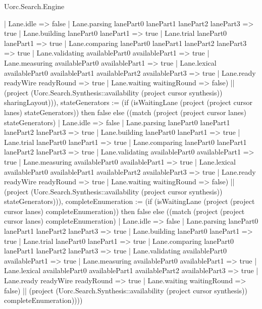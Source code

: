 \begin{lexlean}{Uorc.Search.Engine}
\begin{semanticmodule}
{{    | Lane.idle => false
    | Lane.parsing lanePart0 lanePart1 lanePart2 lanePart3 => true
    | Lane.building lanePart0 lanePart1 => true
    | Lane.trial lanePart0 lanePart1 => true
    | Lane.comparing lanePart0 lanePart1 lanePart2 lanePart3 => true
    | Lane.validating availablePart0 availablePart1 => true
    | Lane.measuring availablePart0 availablePart1 => true
    | Lane.lexical availablePart0 availablePart1 availablePart2 availablePart3 => true
    | Lane.ready readyWire readyRound => true
    | Lane.waiting waitingRound => false) || (project (Uorc.Search.Synthesis::availability (project cursor synthesis)) sharingLayout))), stateGenerators := (if (isWaitingLane (project (project cursor lanes) stateGenerators)) then false else ((match (project (project cursor lanes) stateGenerators)
    | Lane.idle => false
    | Lane.parsing lanePart0 lanePart1 lanePart2 lanePart3 => true
    | Lane.building lanePart0 lanePart1 => true
    | Lane.trial lanePart0 lanePart1 => true
    | Lane.comparing lanePart0 lanePart1 lanePart2 lanePart3 => true
    | Lane.validating availablePart0 availablePart1 => true
    | Lane.measuring availablePart0 availablePart1 => true
    | Lane.lexical availablePart0 availablePart1 availablePart2 availablePart3 => true
    | Lane.ready readyWire readyRound => true
    | Lane.waiting waitingRound => false) || (project (Uorc.Search.Synthesis::availability (project cursor synthesis)) stateGenerators))), completeEnumeration := (if (isWaitingLane (project (project cursor lanes) completeEnumeration)) then false else ((match (project (project cursor lanes) completeEnumeration)
    | Lane.idle => false
    | Lane.parsing lanePart0 lanePart1 lanePart2 lanePart3 => true
    | Lane.building lanePart0 lanePart1 => true
    | Lane.trial lanePart0 lanePart1 => true
    | Lane.comparing lanePart0 lanePart1 lanePart2 lanePart3 => true
    | Lane.validating availablePart0 availablePart1 => true
    | Lane.measuring availablePart0 availablePart1 => true
    | Lane.lexical availablePart0 availablePart1 availablePart2 availablePart3 => true
    | Lane.ready readyWire readyRound => true
    | Lane.waiting waitingRound => false) || (project (Uorc.Search.Synthesis::availability (project cursor synthesis)) completeEnumeration)))})
}


\end{semanticmodule}
\end{lexlean}
